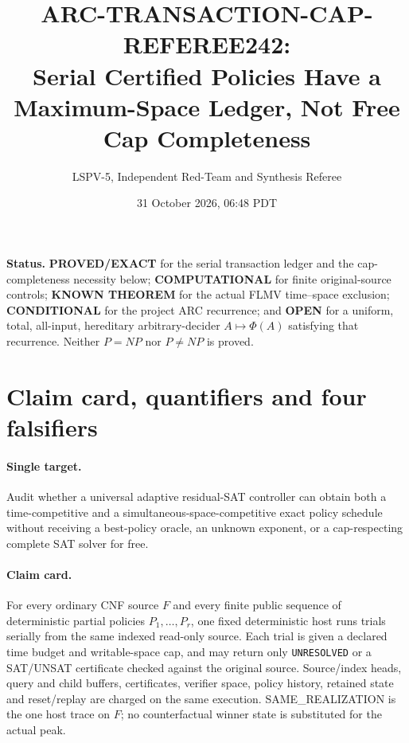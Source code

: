 \documentclass[11pt]{article}
\title{ARC-TRANSACTION-CAP-REFEREE242:\\Serial Certified Policies Have a Maximum-Space Ledger, Not Free Cap Completeness}
\author{LSPV-5, Independent Red-Team and Synthesis Referee}
\date{31 October 2026, 06:48 PDT}
\begin{document}
\maketitle

\noindent\textbf{Status.}
\textbf{PROVED/EXACT} for the serial transaction ledger and the cap-completeness
necessity below; \textbf{COMPUTATIONAL} for finite original-source controls;
\textbf{KNOWN THEOREM} for the actual FLMV time--space exclusion;
\textbf{CONDITIONAL} for the project ARC recurrence; and \textbf{OPEN} for a
uniform, total, all-input, hereditary arbitrary-decider
$A\mapsto\Phi(A)$ satisfying that recurrence.  Neither $P=NP$ nor $P\ne NP$
is proved.

\section{Claim card, quantifiers and four falsifiers}
\paragraph{Single target.}
Audit whether a universal adaptive residual-SAT controller can obtain both a
time-competitive and a simultaneous-space-competitive exact policy schedule
without receiving a best-policy oracle, an unknown exponent, or a
cap-respecting complete SAT solver for free.

\paragraph{Claim card.}
For every ordinary CNF source $F$ and every finite public sequence of
deterministic partial policies $P_1,\ldots,P_r$, one fixed deterministic host
runs trials serially from the same indexed read-only source.  Each trial is
given a declared time budget and writable-space cap, and may return only
\texttt{UNRESOLVED} or a SAT/UNSAT certificate checked against the original
source.  Source/index heads, query and child buffers, certificates, verifier
space, policy history, retained state and reset/replay are charged on the same
execution.  SAME\_REALIZATION is the one host trace on $F$; no counterfactual
winner state is substituted for the actual peak.
\end{document}
